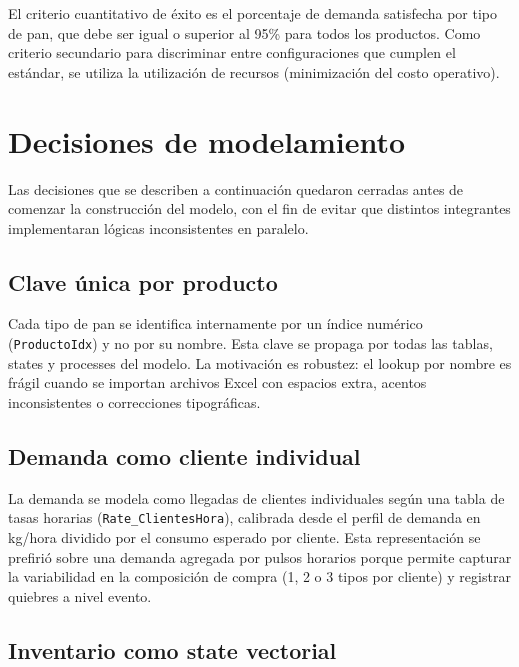 \documentclass[12pt]{article}
\begin{document}
El criterio cuantitativo de éxito es el porcentaje de demanda satisfecha por tipo de pan, que debe ser igual o superior al 95\% para todos los productos. Como criterio secundario para discriminar entre configuraciones que cumplen el estándar, se utiliza la utilización de recursos (minimización del costo operativo).

\newpage
\section{Decisiones de modelamiento}

Las decisiones que se describen a continuación quedaron cerradas antes de comenzar la construcción del modelo, con el fin de evitar que distintos integrantes implementaran lógicas inconsistentes en paralelo.

\subsection{Clave única por producto}

Cada tipo de pan se identifica internamente por un índice numérico (\texttt{ProductoIdx}) y no por su nombre. Esta clave se propaga por todas las tablas, states y processes del modelo. La motivación es robustez: el lookup por nombre es frágil cuando se importan archivos Excel con espacios extra, acentos inconsistentes o correcciones tipográficas.

\subsection{Demanda como cliente individual}

La demanda se modela como llegadas de clientes individuales según una tabla de tasas horarias (\texttt{Rate\_ClientesHora}), calibrada desde el perfil de demanda en kg/hora dividido por el consumo esperado por cliente. Esta representación se prefirió sobre una demanda agregada por pulsos horarios porque permite capturar la variabilidad en la composición de compra (1, 2 o 3 tipos por cliente) y registrar quiebres a nivel evento.

\subsection{Inventario como state vectorial}
\end{document}
